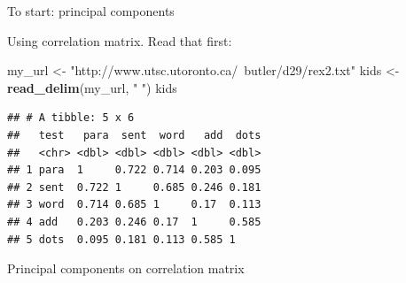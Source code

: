 \documentclass[ignorenonframetext,]{beamer}
\newenvironment{Shaded}{\begin{snugshade}}{\end{snugshade}}
\newcommand{\DataTypeTok}[1]{\textcolor[rgb]{0.13,0.29,0.53}{#1}}
\newcommand{\KeywordTok}[1]{\textcolor[rgb]{0.13,0.29,0.53}{\textbf{#1}}}
\newcommand{\NormalTok}[1]{#1}
\newcommand{\OperatorTok}[1]{\textcolor[rgb]{0.81,0.36,0.00}{\textbf{#1}}}
\newcommand{\StringTok}[1]{\textcolor[rgb]{0.31,0.60,0.02}{#1}}
\begin{document}
\begin{frame}[fragile]{To start: principal components}
\protect\hypertarget{to-start-principal-components}{}

Using correlation matrix. Read that first:

\begin{Shaded}
\begin{Highlighting}[]
\NormalTok{my_url <-}\StringTok{ "http://www.utsc.utoronto.ca/~butler/d29/rex2.txt"}
\NormalTok{kids <-}\StringTok{ }\KeywordTok{read_delim}\NormalTok{(my_url, }\StringTok{" "}\NormalTok{)}
\NormalTok{kids}
\end{Highlighting}
\end{Shaded}

\begin{verbatim}
## # A tibble: 5 x 6
##   test   para  sent  word   add  dots
##   <chr> <dbl> <dbl> <dbl> <dbl> <dbl>
## 1 para  1     0.722 0.714 0.203 0.095
## 2 sent  0.722 1     0.685 0.246 0.181
## 3 word  0.714 0.685 1     0.17  0.113
## 4 add   0.203 0.246 0.17  1     0.585
## 5 dots  0.095 0.181 0.113 0.585 1
\end{verbatim}

\end{frame}

\begin{frame}[fragile]{Principal components on correlation matrix}
\protect\hypertarget{principal-components-on-correlation-matrix}{}

\begin{Shaded}
\end{Shaded}

\end{frame}
\end{document}
